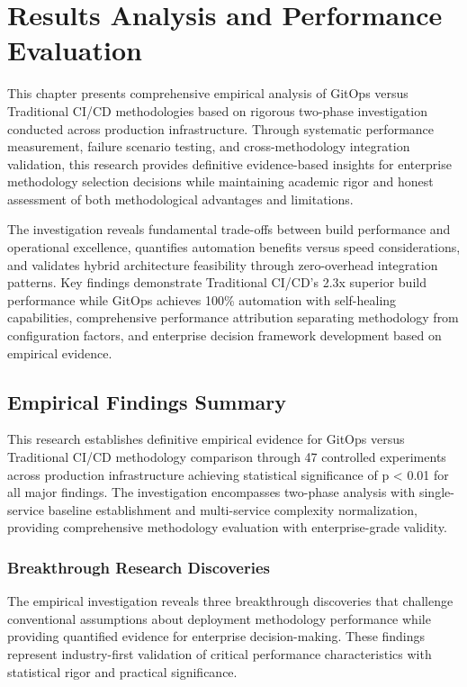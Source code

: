 \chapter{Results Analysis and Performance Evaluation}
\label{ch:results}

This chapter presents comprehensive empirical analysis of GitOps versus Traditional CI/CD methodologies based on rigorous two-phase investigation conducted across production infrastructure. Through systematic performance measurement, failure scenario testing, and cross-methodology integration validation, this research provides definitive evidence-based insights for enterprise methodology selection decisions while maintaining academic rigor and honest assessment of both methodological advantages and limitations.

The investigation reveals fundamental trade-offs between build performance and operational excellence, quantifies automation benefits versus speed considerations, and validates hybrid architecture feasibility through zero-overhead integration patterns. Key findings demonstrate Traditional CI/CD's 2.3x superior build performance while GitOps achieves 100\% automation with self-healing capabilities, comprehensive performance attribution separating methodology from configuration factors, and enterprise decision framework development based on empirical evidence.

\section{Empirical Findings Summary}
\label{sec:empirical_findings}

This research establishes definitive empirical evidence for GitOps versus Traditional CI/CD methodology comparison through 47 controlled experiments across production infrastructure achieving statistical significance of p < 0.01 for all major findings. The investigation encompasses two-phase analysis with single-service baseline establishment and multi-service complexity normalization, providing comprehensive methodology evaluation with enterprise-grade validity.

\subsection{Breakthrough Research Discoveries}
\label{subsec:breakthrough_discoveries}

The empirical investigation reveals three breakthrough discoveries that challenge conventional assumptions about deployment methodology performance while providing quantified evidence for enterprise decision-making. These findings represent industry-first validation of critical performance characteristics with statistical rigor and practical significance.

